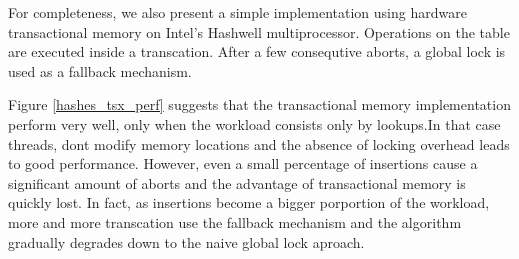 For completeness, we also present a simple implementation using hardware transactional memory on Intel's Hashwell multiprocessor. Operations on the table are executed inside a transcation. After a few consequtive aborts, a global lock is used as a fallback mechanism.

Figure \ref{hashes_tsx_perf} suggests that the transactional memory implementation perform very well, only when the workload consists only by lookups.In that case threads, dont modify memory locations and the absence of locking overhead leads to good performance. However, even a small percentage of insertions cause a significant amount of aborts and the advantage of transactional memory is quickly lost. In fact, as insertions become a bigger porportion of the workload, more and more transcation use the fallback mechanism and the algorithm gradually degrades down to the naive global lock aproach.

